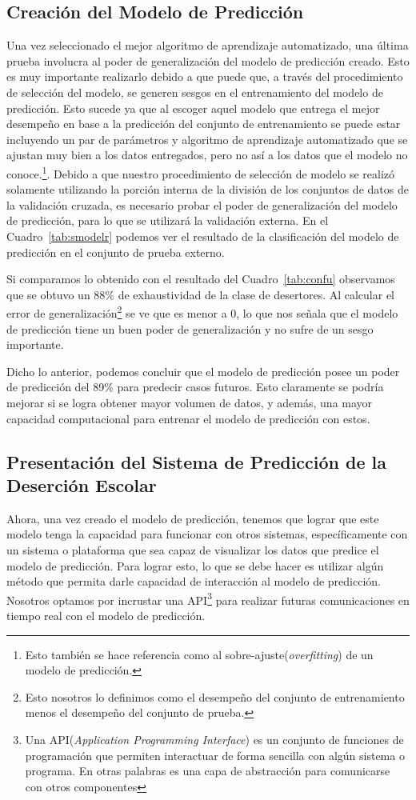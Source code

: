 \subsection{Creación del Modelo de Predicción}
Una vez seleccionado el mejor algoritmo de aprendizaje automatizado, una última prueba involucra al poder de generalización del modelo de predicción creado. Esto es muy importante realizarlo debido a que puede que, a través del procedimiento de selección del modelo, se generen sesgos en el entrenamiento del modelo de predicción. Esto sucede ya que al escoger aquel modelo que entrega el mejor desempeño en base a la predicción del conjunto de entrenamiento se puede estar incluyendo un par de parámetros y algoritmo de aprendizaje automatizado que se ajustan muy bien a los datos entregados, pero no así a los datos que el modelo no conoce.\footnote{Esto también se hace referencia como al sobre-ajuste(\textit{overfitting}) de un modelo de predicción.}. Debido a que nuestro procedimiento de selección de modelo se realizó solamente utilizando la porción interna de la división de los conjuntos de datos de la validación cruzada, es necesario probar el poder de generalización del modelo de predicción, para lo que se utilizará la validación externa. En el Cuadro~\ref{tab:smodelr} podemos ver el resultado de la clasificación del modelo de predicción en el conjunto de prueba externo.


Si comparamos lo obtenido con el resultado del Cuadro~\ref{tab:confu} observamos que se obtuvo un 88\% de exhaustividad de la clase de desertores. Al calcular el error de generalización\footnote{Esto nosotros lo definimos como el desempeño del conjunto de entrenamiento menos el desempeño del conjunto de prueba.} se ve que es menor a 0, lo que nos señala que el modelo de predicción tiene un buen poder de generalización y no sufre de un sesgo importante.

Dicho lo anterior, podemos concluir que el modelo de predicción posee un poder de predicción del 89\% para predecir casos futuros. Esto claramente se podría mejorar si se logra obtener mayor volumen de datos, y además, una mayor capacidad computacional para entrenar el modelo de predicción con estos.

\subsection{Presentación del Sistema de Predicción de la Deserción Escolar}
Ahora, una vez creado el modelo de predicción, tenemos que lograr que este modelo tenga la capacidad para funcionar con otros sistemas, específicamente con un sistema o plataforma que sea capaz de visualizar los datos que predice el modelo de predicción. Para lograr esto, lo que se debe hacer es utilizar algún método que permita darle capacidad de interacción al modelo de predicción. Nosotros optamos por incrustar una API\footnote{Una API(\textit{Application Programming Interface}) es un conjunto de funciones de programación que permiten interactuar de forma sencilla con algún sistema o programa. En otras palabras es una capa de abstracción para comunicarse con otros componentes} para realizar futuras comunicaciones en tiempo real con el modelo de predicción.

